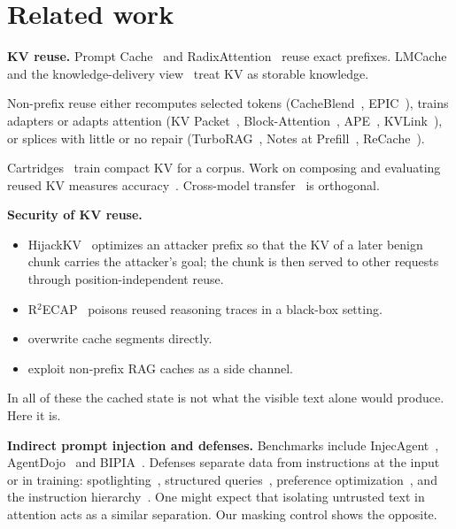 \documentclass[10pt]{article}
\begin{document}
\section{Related work}\label{sec:related}
\textbf{KV reuse.} Prompt Cache~\citep{gim2024promptcache} and RadixAttention~\citep{zheng2024sglang} reuse exact prefixes.
LMCache~\citep{liu2025lmcache} and the knowledge-delivery view~\citep{cheng2024kdn} treat KV as storable knowledge.

Non-prefix reuse either recomputes selected tokens (CacheBlend~\citep{yao2025cacheblend}, EPIC~\citep{hu2024epic}), trains
adapters or adapts attention (KV Packet~\citep{chen2026kvpacket}, Block-Attention~\citep{ma2025blockattention},
APE~\citep{yang2025ape}, KVLink~\citep{yang2025kvlink}), or splices with little or no repair (TurboRAG~\citep{lu2024turborag},
Notes at Prefill~\citep{li2026notes}, ReCache~\citep{fang2026recache}).

Cartridges~\citep{eyuboglu2025cartridges} train compact KV for a corpus. Work on composing and evaluating reused KV measures
accuracy~\citep{shepard2026costs,rakotonirina2026where,cestola2026evaluating}. Cross-model transfer~\citep{liu2024droidspeak,fu2025c2c}
is orthogonal.

\textbf{Security of KV reuse.}
\begin{itemize}
\item HijackKV~\citep{zhang2026hijackkv} optimizes an attacker prefix so that the KV of a later benign chunk carries the
  attacker's goal; the chunk is then served to other requests through position-independent reuse.
\item R$^2$ECAP~\citep{zhu2026r2ecap} poisons reused reasoning traces in a black-box setting.
\item \citet{ganesh2025narrative} overwrite cache segments directly.
\item \citet{sun2026sidechannel} exploit non-prefix RAG caches as a side channel.
\end{itemize}
In all of these the cached state is not what the visible text alone would produce. Here it is.

\textbf{Indirect prompt injection and defenses.} Benchmarks include InjecAgent~\citep{zhan2024injecagent},
AgentDojo~\citep{debenedetti2024agentdojo} and BIPIA~\citep{yi2025bipia}. Defenses separate data from instructions at the input or
in training: spotlighting~\citep{hines2024spotlighting}, structured queries~\citep{chen2025struq}, preference
optimization~\citep{chen2025secalign}, and the instruction hierarchy~\citep{wallace2024hierarchy}. One might expect that isolating
untrusted text in attention acts as a similar separation. Our masking control shows the opposite.
\end{document}
